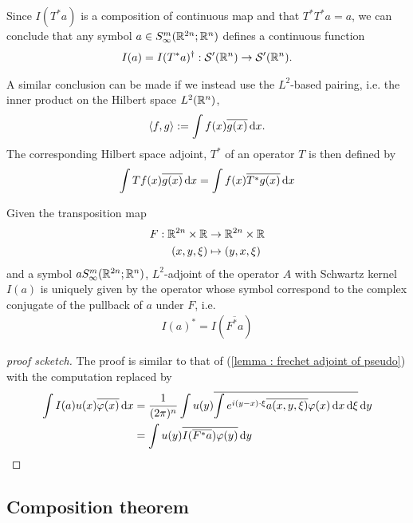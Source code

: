 \documentclass[12pt]{article}
\begin{document}
\begin{rem}
    Since $I(T^*a)$ is a composition of continuous map and that $T^* T^* a = a$, we can conclude that any symbol $a \in S^{m}_{\infty}(\R^{2n}; \R^{n})$ defines a continuous function 
    \begin{align*}
    I(a) = I(T^* a)^\dagger : \sch'(\R^n) \to \sch'(\R^n). 
    \end{align*}
\end{rem}


A similar conclusion can be made if we instead use the $L^2$-based pairing, i.e. the inner product on the Hilbert space $L^2(\R^n)$, 
\begin{align*}
\inprod[f, g] := \int f(x) \overline{g(x)} \d[x]. 
\end{align*}
The corresponding Hilbert space adjoint, $T^*$ of an operator $T$ is then defined by 
\begin{align*}
\int Tf(x) \overline{g(x)} \d[x] = \int f(x) \overline{T^* g(x)} \d[x]
\end{align*}


\begin{flemma}
    Given the transposition map 
    \begin{align*}
    F : \R^{2n} \times \R &\to \R^{2n} \times \R \\
    (x, y, \xi) &\mapsto (y, x, \xi)
    \end{align*}
    and a symbol $a S^{m}_{\infty}(\R^{2n}; \R^{n})$, $L^2$-adjoint of the operator $A$ with Schwartz kernel $I(a)$ is uniquely given by the operator whose symbol correspond to the complex conjugate of the pullback of $a$ under $F$, i.e. 
    \begin{align*}
    I(a)^* = I(\overline{F^*a})
    \end{align*}    
\end{flemma}
\begin{proof}[proof scketch]
    The proof is similar to that of (\ref{lemma : frechet adjoint of pseudo}) with the computation replaced by 
    \begin{align*}
    \int I(a)u(x) \overline{\varphi(x)} \d[x] 
    & = \frac{1}{(2\pi)^n} \int u(y) \overline{\int e^{i (y - x) \cdot \xi} \overline{a(x, y, \xi)} \varphi(x) \d[x] \d[\xi] } \d[y]\\
    & = \int u(y) \overline{I(\overline{F^*a})\varphi(y)} \d[y]
    \end{align*}
\end{proof}


\subsection{Composition theorem}
\end{document}
